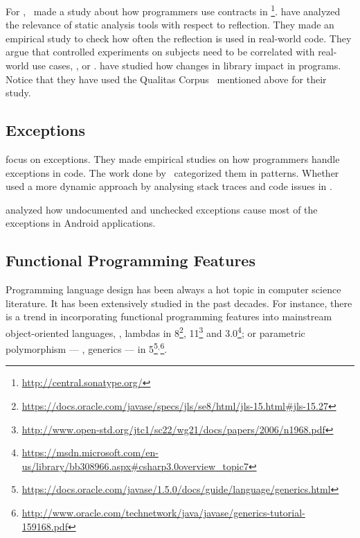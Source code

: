 For \java{},~\cite{dietrichContractsWildStudy2017a} made a study about how programmers use contracts in \mavencentral{}\footnote{\url{http://central.sonatype.org/}}.
\cite{landmanChallengesStaticAnalysis2017} have analyzed the relevance of static analysis tools with respect to reflection.
They made an empirical study to check how often the reflection \api{} is used in real-world code.
They argue that controlled experiments on subjects need to be correlated with real-world use cases, \eg{}, \github{} or \mavencentral{}.
\cite{dietrichBrokenPromisesEmpirical2014} have studied how changes in \api{} library impact in \java{} programs.
Notice that they have used the Qualitas Corpus~\cite{temperoQualitasCorpusCurated2010} mentioned above for their study.

\subsection*{Exceptions}

\cite{keryExaminingProgrammerPractices2016,asaduzzamanHowDevelopersUse2016} focus on exceptions.
They made empirical studies on how programmers handle exceptions in \java{} code.
The work done by~\cite{nakshatriAnalysisExceptionHandling2016} categorized them in patterns.
Whether~\cite{coelhoUnveilingExceptionHandling2015} used a more dynamic approach by analysing stack traces and code issues in \github{}.

\cite{kechagiaUndocumentedUncheckedExceptions2014} analyzed how undocumented and
unchecked exceptions cause most of the exceptions in
Android applications.

\subsection*{Functional Programming Features}

Programming language design has been always a hot topic in computer science literature.
It has been extensively studied in the past decades.
For instance, there is a trend in incorporating functional programming features into mainstream object-oriented languages, \eg, lambdas in \java{} 8\footnote{\url{https://docs.oracle.com/javase/specs/jls/se8/html/jls-15.html\#jls-15.27}}, \cpp{}11\footnote{\url{http://www.open-std.org/jtc1/sc22/wg21/docs/papers/2006/n1968.pdf}} and \cs{} 3.0\footnote{\url{https://msdn.microsoft.com/en-us/library/bb308966.aspx\#csharp3.0overview\_topic7}}; or parametric polymorphism --- \ie{}, generics --- in \java{} 5\footnote{\url{https://docs.oracle.com/javase/1.5.0/docs/guide/language/generics.html}}\(^{,}\)\footnote{\url{http://www.oracle.com/technetwork/java/javase/generics-tutorial-159168.pdf}}.

